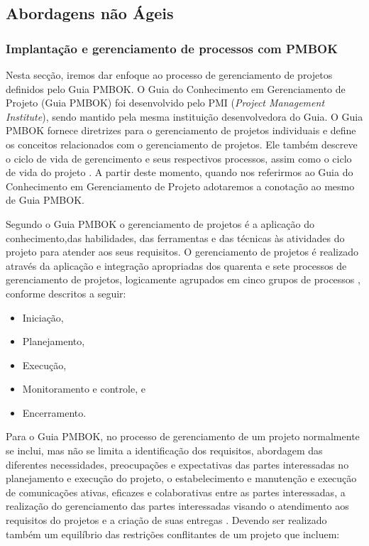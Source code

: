 \documentclass{acm_proc_article-sp}
\begin{document}
\subsection{Abordagens não Ágeis}
\subsubsection{Implantação e gerenciamento de processos com PMBOK}
Nesta secção, iremos dar enfoque ao processo de gerenciamento de projetos definidos pelo Guia PMBOK. O Guia do Conhecimento em Gerenciamento de Projeto (Guia PMBOK) foi desenvolvido pelo PMI (\textit{Project Management Institute}), sendo mantido pela mesma instituição desenvolvedora do Guia. O Guia PMBOK fornece diretrizes para o gerenciamento de projetos individuais e define os conceitos relacionados com o gerenciamento de projetos. Ele também descreve o ciclo de vida de gerencimento e seus respectivos processos, assim como o ciclo de vida do projeto \cite{pmbok:nAgil}. A partir deste momento, quando nos referirmos ao Guia do Conhecimento em Gerenciamento de Projeto adotaremos a conotação ao mesmo de Guia PMBOK.

Segundo o Guia PMBOK o gerenciamento de projetos é a aplicação do conhecimento,das habilidades, das ferramentas e das técnicas às atividades do projeto para atender aos seus requisitos. O gerenciamento de projetos é realizado através da aplicação e integração apropriadas dos quarenta e sete processos de gerenciamento de projetos, logicamente agrupados em cinco grupos de processos \cite{pmbok:nAgil}, conforme descritos a seguir:

\begin{itemize}
\item Iniciação,
\item Planejamento,
\item Execução,
\item Monitoramento e controle, e
\item Encerramento.
\end{itemize}

Para o Guia PMBOK, no processo de gerenciamento de um projeto normalmente se inclui, mas não se limita a identificação dos requisitos, abordagem das diferentes necessidades, preocupações e expectativas das partes interessadas no planejamento e execução do projeto, o estabelecimento e manutenção e execução de comunicações ativas, eficazes e colaborativas entre as partes interessadas, a realização do gerenciamento das partes interessadas  visando o atendimento aos requisitos do projetos e a criação de suas entregas \cite{pmbok:nAgil}. Devendo ser realizado também um equilíbrio das restrições conflitantes de um projeto que incluem:
\end{document}
